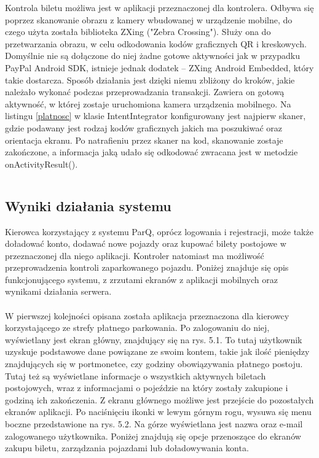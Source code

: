 Kontrola biletu możliwa jest w aplikacji przeznaczonej dla kontrolera. Odbywa się poprzez skanowanie obrazu z kamery wbudowanej w urządzenie mobilne, do czego użyta została biblioteka ZXing ("Zebra Crossing"). Służy ona do przetwarzania obrazu, w celu odkodowania kodów graficznych QR i kreskowych. Domyślnie nie są dołączone do niej żadne gotowe aktywności jak w przypadku PayPal Android SDK, istnieje jednak dodatek -- ZXing Android Embedded, który takie dostarcza. Sposób działania jest dzięki niemu zbliżony do kroków, jakie należało wykonać podczas przeprowadzania transakcji. Zawiera on gotową aktywność, w której zostaje uruchomiona kamera urządzenia mobilnego. Na listingu \ref{platnosc} w klasie IntentIntegrator konfigurowany jest najpierw skaner, gdzie podawany jest rodzaj kodów graficznych jakich ma poszukiwać oraz orientacja ekranu. Po natrafieniu przez skaner na kod, skanowanie zostaje zakończone, a informacja jaką udało się odkodować zwracana jest w metodzie onActivityResult().

\begin{singlespace}
	\label{platnosc}
	\vspace{0.3cm}
	\inputminted[fontsize=\footnotesize, linenos=true]{java}{src/imp/start-scan.java}
\end{singlespace}

\newpage

\subsection{Wyniki działania systemu}

Kierowca korzystający z systemu ParQ, oprócz logowania i rejestracji, może także doładować konto, dodawać nowe pojazdy oraz kupować bilety postojowe w przeznaczonej dla niego aplikacji. Kontroler natomiast ma możliwość przeprowadzenia kontroli zaparkowanego pojazdu. Poniżej znajduje się opis funkcjonującego systemu, z zrzutami ekranów z aplikacji mobilnych oraz wynikami działania serwera.
\\
\\
W pierwszej kolejności opisana została aplikacja przeznaczona dla kierowcy korzystającego ze strefy płatnego parkowania. Po zalogowaniu do niej, wyświetlany jest ekran główny, znajdujący się na rys. 5.1. To tutaj użytkownik uzyskuje podstawowe dane powiązane ze swoim kontem, takie jak ilość pieniędzy znajdujących się w portmonetce, czy godziny obowiązywania płatnego postoju. Tutaj też są wyświetlane informacje o wszystkich aktywnych biletach postojowych, wraz z informacjami o pojeździe na który zostały zakupione i godziną ich zakończenia. Z ekranu głównego możliwe jest przejście do pozostałych ekranów aplikacji. Po naciśnięciu ikonki w lewym górnym rogu, wysuwa się menu boczne przedstawione na rys. 5.2. Na górze wyświetlana jest nazwa oraz e-mail zalogowanego użytkownika. Poniżej znajdują się opcje przenoszące do ekranów zakupu biletu, zarządzania pojazdami lub doładowywania konta.

